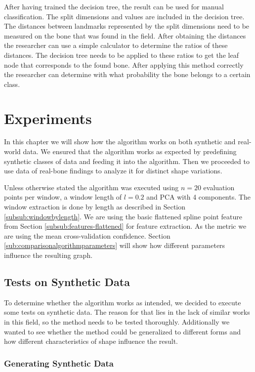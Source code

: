 \documentclass[pdftex,12pt,a4paper]{report}
\begin{document}
After having trained the decision tree, the result can be used for manual classification. The split dimensions and values are included in the decision tree. The distances between landmarks represented by the split dimensions need to be measured on the bone that was found in the field. After obtaining the distances the researcher can use a simple calculator to determine the ratios of these distances. The decision tree needs to be applied to these ratios to get the leaf node that corresponds to the found bone. After applying this method correctly the researcher can determine with what probability the bone belongs to a certain class.

\chapter{Experiments}

In this chapter we will show how the algorithm works on both synthetic and real-world data. We ensured that the algorithm works as expected by predefining synthetic classes of data and feeding it into the algorithm. Then we proceeded to use data of real-bone findings to analyze it for distinct shape variations. 

Unless otherwise stated the algorithm was executed using $n=20$ evaluation points per window, a window length of $l=0.2$ and PCA with 4 components. The window extraction is done by length as described in Section \ref{subsub:windowbylength}. We are using the basic flattened spline point feature from Section \ref{subsub:features-flattened} for feature extraction. As the metric we are using the mean cross-validation confidence. Section \ref{sub:comparisonalgorithmparameters} will show how different parameters influence the resulting graph.

\section{Tests on Synthetic Data}

To determine whether the algorithm works as intended, we decided to execute some tests on synthetic data. The reason for that lies in the lack of similar works in this field, so the method needs to be tested thoroughly. Additionally we wanted to see whether the method could be generalized to different forms and how different characteristics of shape influence the result. 

\subsection{Generating Synthetic Data}
\label{sub:generating-synthetic-data}
\end{document}
